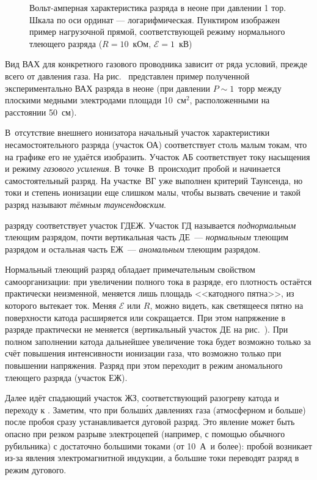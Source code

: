 \begin{labsupplement}
\begin{figure}[h!]
    \centering
    \caption{Вольт-амперная характеристика разряда в неоне при давлении 1 тор. 
        Шкала по оси ординат --- логарифмическая.
        Пунктиром изображен пример нагрузочной прямой,
        соответствующей режиму нормального тлеющего разряда
        ($R=10$~кОм, $\mathcal{E}=1$~кВ)}
\end{figure}

Вид ВАХ для конкретного газового проводника зависит от ряда условий, прежде
всего от давления газа. На рис.~ представлен пример
полученной экспериментально ВАХ разряда в неоне (при давлении $P\sim 1$~торр
между плоскими медными электродами площади 10~см$^2$, расположенными на
расстоянии 50~см).

В~отсутствие внешнего ионизатора начальный участок
характеристики несамостоятельного разряда (участок ОА) соответствует столь
малым токам, что на графике его не удаётся изобразить. Участок 
АБ соответствует току насыщения и режиму \emph{газового усиления}. 
В~точке~В~происходит пробой и начинается самостоятельный
разряд. На участке~ВГ уже выполнен критерий Таунсенда, но 
токи и степень ионизации еще слишком малы, чтобы вызвать свечение 
и такой разряд называют \emph{тёмным таунсендовским}.

 разряду соответствует участок ГДЕЖ.
Участок ГД называется \emph{поднормальным} тлеющим разрядом,
почти вертикальная часть ДЕ~--- \emph{нормальным} тлеющим разрядом и
остальная часть ЕЖ~--- \emph{аномальным} тлеющим разрядом.

Нормальный тлеющий разряд обладает примечательным свойством самоорганизации:
при увеличении полного тока в разряде, его плотность остаётся практически
неизменной, меняется лишь площадь <<катодного пятна>>, из которого вытекает ток.
Меняя $\mathcal{E}$ или $R$, можно видеть, как светящееся пятно
на поверхности катода расширяется или сокращается.
При этом напряжение в разряде практически не меняется
(вертикальный участок ДЕ на рис.~).
При полном заполнении катода дальнейшее увеличение тока будет возможно только за
счёт повышения интенсивности ионизации газа, что возможно только при повышении
напряжения. Разряд при этом переходит в режим аномального тлеющего разряда
(участок ЕЖ).

Далее идёт спадающий участок ЖЗ, соответствующий разогреву катода и 
переходу к . Заметим, что при больш\'{и}х давлениях газа
(атмосферном и больше) после пробоя сразу устанавливается дуговой разряд.
Это явление может быть опасно при резком разрыве электроцепей (например, с помощью
обычного рубильника) с достаточно большими токами (от 10~А~и более): пробой
возникает из-за явления электромагнитной индукции, а большие токи 
переводят разряд в режим дугового.


\end{labsupplement}

